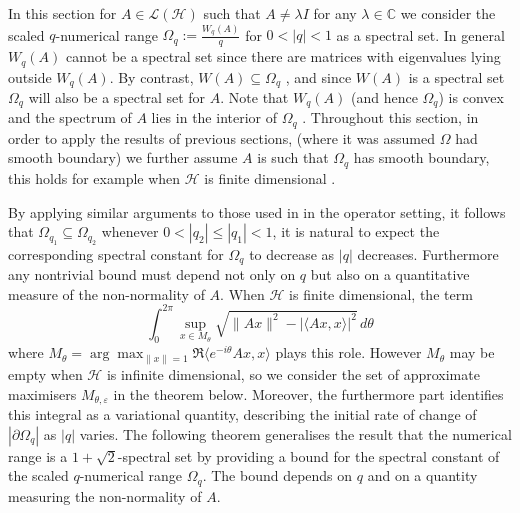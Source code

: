 \documentclass{article}
\begin{document}
In this section for $A \in \mathcal{L}(\mathcal{H})$ such that $A \neq \lambda I$ for any $\lambda \in \mathbb{C}$ we consider the scaled $q$-numerical range $\Omega_q:=\frac{W_q(A)}{q}$ for $0<|q| < 1$ as a spectral set. In general $W_q(A)$ cannot be a spectral set since there are matrices with eigenvalues lying outside $W_q(A)$. By contrast, $W(A)\subseteq \Omega_q$ \cite[p. 381]{gau2021numerical}, and since $W(A)$ is a spectral set $\Omega_q$ will also be a spectral set for $A$. Note that $W_q(A)$ (and hence $\Omega_q$) is convex \cite[p. 381]{gau2021numerical} and the spectrum of $A$ lies in the interior of $\Omega_q$ \cite[Theorem 2.10]{li1994generalized}. Throughout this section, in order to apply the results of previous sections, (where it was assumed $\Omega$ had smooth boundary) we further assume $A$ is such that $\Omega_q$ has smooth boundary, this holds for example when $\mathcal{H}$ is finite dimensional \cite{rajic2005generalized}.




By applying similar arguments to those used in 
\cite[Theorem 2.5]{li1994generalized} 
in the operator setting, it follows that 
$\Omega_{q_1} \subseteq \Omega_{q_2}$ 
whenever $0 < |q_2| \le |q_1| < 1$, it is natural to expect the corresponding spectral constant for $\Omega_q$ to decrease as $|q|$ decreases. 
% 
Furthermore any nontrivial bound must depend not only on $q$ but also on a quantitative measure of the non-normality of $A$. When $\mathcal{H}$ is finite dimensional, the term
\[
\int_0^{2\pi}\sup_{x\in M_\theta}\sqrt{\|Ax\|^2-|\langle Ax,x\rangle|^2}\,d\theta
\]
 where $M_\theta=\arg\max_{\|x\|=1}\Re\langle e^{-i \theta}A x,x\rangle$ plays this role. However $M_\theta$ may be empty when $\mathcal{H}$ is infinite dimensional, so we consider the set of approximate maximisers $M_{\theta, \varepsilon}$ in the theorem below. Moreover, the furthermore part identifies this integral as a variational quantity, describing the initial rate of change of $|\partial \Omega_q|$ as $|q|$ varies. The following theorem generalises the result that the numerical range is a
$1+\sqrt{2}$-spectral set \cite{1root2} by providing a bound for the spectral constant of
the scaled $q$-numerical range $\Omega_q$. The bound depends on $q$ and on a
quantity measuring the non-normality of $A$.
\end{document}
